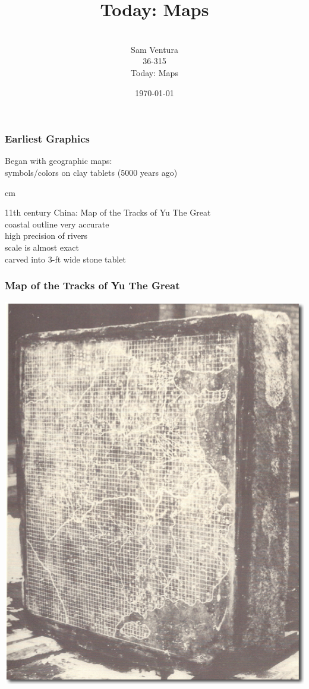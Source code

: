 \documentclass{beamer} %
\begin{document}
\title[dedup]{Today:  Maps}


\author[Samuel L. Ventura]{\\
  \large{Sam Ventura\\36-315\\Today:  Maps}}
\date{\today}


\begin{frame}
	\maketitle

	
\end{frame}




\begin{frame}\frametitle{Earliest Graphics}
	\centering
	Began with geographic maps:  \\symbols/colors on clay tablets (5000 years ago)
	
	 cm
	
	11th century China:  Map of the Tracks of Yu The Great\\coastal outline very accurate\\high precision of rivers\\scale is almost exact\\carved into 3-ft wide stone tablet
	
\end{frame}



\begin{frame}\frametitle{Map of the Tracks of Yu The Great}
	\centering
	\includegraphics[width=0.6\linewidth]{yu2.png}
\end{frame}
\end{document}
